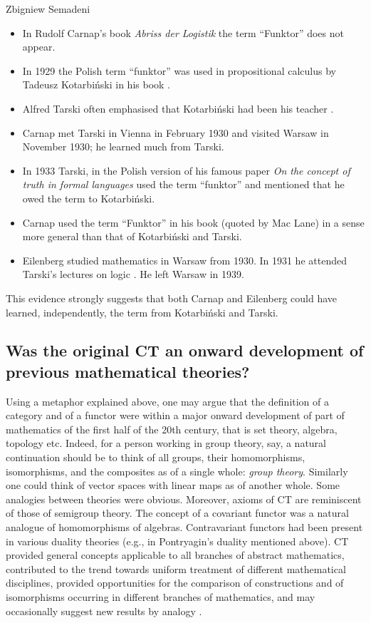 \begin{artengenv}{Zbigniew Semadeni}
\begin{itemize}
\item In Rudolf Carnap's book \textit{Abriss der Logistik} \parencite{Abriss} the term ``Funktor'' does not appear. 
\item In 1929 the Polish term ``funktor'' was used in propositional calculus by 
Tadeusz Kotarbi\'nski in his book \parencite{Kotarbinski}.
\item Alfred Tarski often emphasised that Kotarbi\'nski had been his teacher 
\parencite[part~2]{Feferman}. 
\item Carnap met Tarski in Vienna in February 1930 and visited Warsaw in November 
1930; he learned much from Tarski. 
\item In 1933 Tarski, in the Polish version of his famous paper \textit{On the 
concept of truth in formal languages} \citeauthor{Tarski_sem} \parencite*{Tarski_sem} used the term ``funktor'' 
and mentioned that he owed the term to Kotarbiński.  
\item Carnap used the term ``Funktor''  in his book \parencite*{Logische} (quoted 
by Mac Lane) in a sense more general than that of Kotarbi\'nski and Tarski. 
\item Eilenberg studied mathematics in Warsaw from 1930. In 1931 he attended 
Tarski's lectures on logic \parencite[part~3 and~12]{Feferman}. He left Warsaw in 1939. 
\end{itemize}

This evidence strongly suggests that both Carnap and Eilenberg could have learned, 
independently, the term from Kotarbi{\'n}ski and Tarski.

\subsection{Was the original CT an onward development of previous mathematical theories?}
Using a metaphor explained above, one may argue that the definition of a 
category and of a functor were within a major onward development of part of 
mathematics of the first half of the 20th century, that is set theory, 
algebra, topology etc. Indeed, for a person working in group theory, say, 
a natural continuation should be to think of all groups, their homomorphisms, 
isomorphisms, and the composites as of a single whole: \textit{group theory}. 
Similarly one could think of vector spaces with linear maps as of another whole. 
Some analogies between theories were obvious. Moreover, axioms of CT are 
reminiscent of those of semigroup theory. The concept of a covariant functor 
was a natural analogue of homomorphisms of algebras. Contravariant functors 
had been present in various duality theories (e.g., in Pontryagin’s duality 
mentioned above). CT provided general concepts applicable to all branches of abstract 
mathematics, contributed to the trend towards uniform treatment of different 
mathematical disciplines, provided opportunities for the comparison of 
constructions and of isomorphisms occurring in different branches of mathematics, 
and may occasionally  suggest new results by analogy \parencite[p.236]{E-ML}. 


\end{artengenv}

